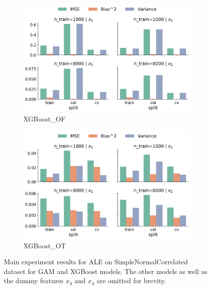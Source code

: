 \documentclass[runningheads]{llncs}
\begin{document}
\begin{figure}[ht!]
\begin{subfigure}[b]{0.49\textwidth}
        \includegraphics[width=\textwidth]{img/SNC/feature_effect_errors_ale_XGBoost_OF.png}
        \caption{XGBoost\_OF}
        \label{fig:ale-results-snc-xgboost-of}  %
    \end{subfigure}
    \hfill
    \begin{subfigure}[b]{0.49\textwidth}
        \includegraphics[width=\textwidth]{img/SNC/feature_effect_errors_ale_XGBoost_OT.png}
        \caption{XGBoost\_OT}
        \label{fig:ale-results-snc-xgboost-ot}  %
    \end{subfigure}
    \caption{Main experiment results for ALE on SimpleNormalCorrelated dataset for GAM and
    XGBoost models. The other models as well as the dummy features $x_3$ and $x_4$
    are omitted for brevity.}
    \label{fig:ale-results-snc}  %
\end{figure}
\end{document}
